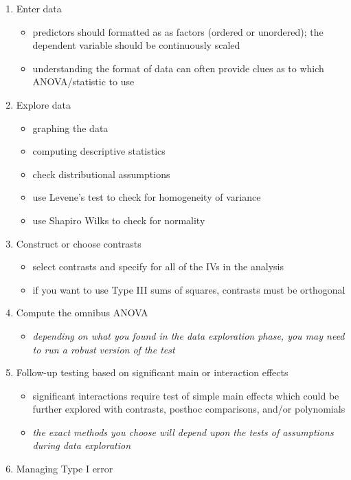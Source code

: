 \documentclass[
  11pt,
]{book}
\providecommand{\tightlist}{%
  \setlength{\itemsep}{0pt}\setlength{\parskip}{0pt}}
\begin{document}
\begin{enumerate}
\def\labelenumi{\arabic{enumi}.}
\tightlist
\item
  Enter data

  \begin{itemize}
  \tightlist
  \item
    predictors should formatted as as factors (ordered or unordered); the dependent variable should be continuously scaled
  \item
    understanding the format of data can often provide clues as to which ANOVA/statistic to use
  \end{itemize}
\item
  Explore data

  \begin{itemize}
  \tightlist
  \item
    graphing the data
  \item
    computing descriptive statistics
  \item
    check distributional assumptions
  \item
    use Levene's test to check for homogeneity of variance
  \item
    use Shapiro Wilks to check for normality
  \end{itemize}
\item
  Construct or choose contrasts

  \begin{itemize}
  \tightlist
  \item
    select contrasts and specify for all of the IVs in the analysis
  \item
    if you want to use Type III sums of squares, contrasts must be orthogonal
  \end{itemize}
\item
  Compute the omnibus ANOVA

  \begin{itemize}
  \tightlist
  \item
    \emph{depending on what you found in the data exploration phase, you may need to run a robust version of the test}
  \end{itemize}
\item
  Follow-up testing based on significant main or interaction effects

  \begin{itemize}
  \tightlist
  \item
    significant interactions require test of simple main effects which could be further explored with contrasts, posthoc comparisons, and/or polynomials
  \item
    \emph{the exact methods you choose will depend upon the tests of assumptions during data exploration}
  \end{itemize}
\item
  Managing Type I error
\end{enumerate}
\end{document}
